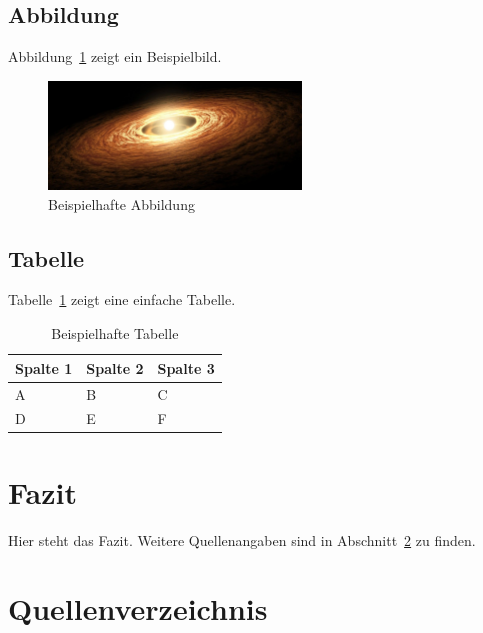 \documentclass[a4paper,12pt]{report}
\begin{document}
\subsection{Abbildung}
Abbildung~\ref{fig:example} zeigt ein Beispielbild.

\begin{figure}[h!]
    \centering
    \includegraphics[width=0.6\textwidth]{universe} %
    \caption{Beispielhafte Abbildung}
    \label{fig:example}
\end{figure}

\subsection{Tabelle}
Tabelle~\ref{tab:example} zeigt eine einfache Tabelle.

\begin{table}[h!]
    \centering
    \begin{tabular}{lll}
        \toprule
        Spalte 1 & Spalte 2 & Spalte 3 \\
        \midrule
        A & B & C \\
        D & E & F \\
        \bottomrule
    \end{tabular}
    \caption{Beispielhafte Tabelle}
    \label{tab:example}
\end{table}

\newpage
\section{Fazit}
Hier steht das Fazit. Weitere Quellenangaben sind in Abschnitt~\ref{sec:references} zu finden.

\newpage
\section{Quellenverzeichnis}
\label{sec:references}
\printbibliography
\end{document}
